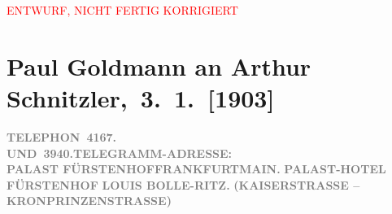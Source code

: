 
\begin{center}
            \textcolor{red}{ENTWURF, NICHT FERTIG KORRIGIERT}
                      \end{center}
            
         
         \renewcommand{\erwaehntePersonen}{Personen:  ?? [Partner von Theodore Rottenberg, Ende 1902/Anfang 1903], Louis Bolle-Ritz, Heinrich Heine, Elise Krinitz, Theodore Rottenberg, Olga Schnitzler, Heinrich Schnitzler}
         \renewcommand{\erwaehnteOrte}{Orte: Frankfurt am Main, Fürstenhof, Kaiserstraße, Monte Carlo, Münchener Straße, Wien}
         \renewcommand{\erwaehnteWerke}{Werke: Gedichte an die Mouche}
               \section[ Paul Goldmann an Arthur Schnitzler, 3. 1. {[}1903{]}]{ Paul Goldmann an Arthur Schnitzler, 3. 1. {[}1903{]}}\nopagebreak{}\rehead{ }\begin{ledgroupsized}[t]{13cm}\normalsize\beginnumbering \toendnotes[C]{\smallbreak\pagebreak[2]} 
\toendnotes[C]{\smallbreak}\pstart
           \noindent{}{\pb}\textcolor{gray}{\textbf{TELEPHON \textbf{4167.}}}{ }{\\}\textcolor{gray}{\textbf{UND \textbf{3940.}}}\hfill \textcolor{gray}{\textbf{TELEGRAMM-ADRESSE:}}{\\}\textcolor{gray}{\textbf{\textbf{PALAST FÜRSTENHOFFRANKFURTMAIN.}}}\pend
           \pstart
           \centering{}\textcolor{gray}{\textbf{\textbf{PALAST-HOTEL}}}\pend
           \pstart
           \noindent{}\centering{}\textcolor{gray}{\textbf{FÜRSTENHOF}}\pend
           \pstart
           \noindent{}\centering{}\textcolor{gray}{\textbf{LOUIS BOLLE-RITZ.}}\pend
           \pstart
           \noindent{}\centering{}\textcolor{gray}{\textbf{(KAISERSTRASSE – KRONPRINZENSTRASSE)}}\pend

\end{ledgroupsized}
